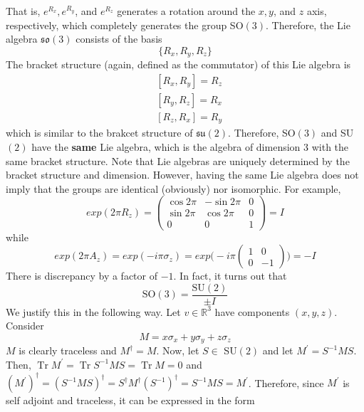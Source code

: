 \documentclass{article}
\DeclareMathOperator{\Tr}{Tr}
\begin{document}
      That is, $e^{R_x}, e^{R_y}$, and $e^{R_z}$ generates a rotation around the $x, y$, and $z$ axis, respectively, which completely generates the group SO$(3)$. Therefore, the Lie algebra $\mathfrak{so}(3)$ consists of the basis 
      \begin{equation}
        \{R_x, R_y, R_z\}
      \end{equation}
      The bracket structure (again, defined as the commutator) of this Lie algebra is 
      \begin{align*}
        & [R_x, R_y] = R_z \\
        & [R_y, R_z] = R_x \\
        & [R_z, R_x] = R_y
      \end{align*}
      which is similar to the brakcet structure of $\mathfrak{su}(2)$. Therefore, SO$(3)$ and SU$(2)$ have the \textbf{same} Lie algebra, which is the algebra of dimension 3 with the same bracket structure. Note that Lie algebras are uniquely determined by the bracket structure and dimension. However, having the same Lie algebra does not imply that the groups are identical (obviously) nor isomorphic. For example, 
      \begin{equation}
        exp(2\pi R_z) = \begin{pmatrix}
        \cos{2\pi} & -\sin{2\pi} & 0 \\
        \sin{2\pi} & \cos{2\pi} & 0 \\
        0 & 0 & 1
        \end{pmatrix} = I
      \end{equation}
      while 
      \begin{equation}
        exp(2\pi A_z) = 
        exp(-i \pi \sigma_z) = exp \bigg(-i \pi \begin{pmatrix}
        1&0\\0&-1
        \end{pmatrix} \bigg) = -I
      \end{equation}
      There is discrepancy by a factor of $-1$. In fact, it turns out that
      \begin{equation}
        \text{SO}(3) = \frac{\text{SU}(2)}{\pm I}
      \end{equation}
      We justify this in the following way. Let $v \in \mathbb{R}^3$ have components $(x, y, z)$. Consider
      \begin{equation}
        M = x \sigma_x + y \sigma_y + z \sigma_z
      \end{equation}
      $M$ is clearly traceless and $M^\dagger = M$. Now, let $S \in$ SU$(2)$ and let $M^\prime = S^{-1} M S$. Then, $\Tr{M^\prime} = \Tr{S^{-1} M S} = \Tr{M} = 0$ and $(M^\prime)^\dagger = (S^{-1} M S)^\dagger = S^\dagger M^\dagger (S^{-1})^\dagger = S^{-1} M S = M^\prime$. Therefore, since $M^\prime$ is self adjoint and traceless, it can be expressed in the form
\end{document}
